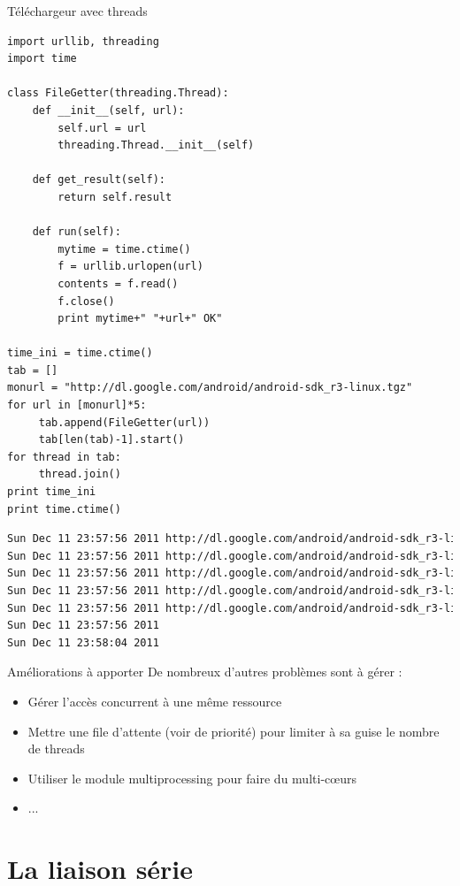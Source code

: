 \documentclass{beamer}
\begin{document}
\begin{frame}[fragile]{Téléchargeur avec threads}
\begin{lstlisting}[basicstyle=\tiny, multicols=2]
import urllib, threading
import time

class FileGetter(threading.Thread):
    def __init__(self, url):
        self.url = url
        threading.Thread.__init__(self)

    def get_result(self):
        return self.result

    def run(self):
        mytime = time.ctime()
        f = urllib.urlopen(url)
        contents = f.read()
        f.close()
        print mytime+" "+url+" OK"

time_ini = time.ctime()
tab = []
monurl = "http://dl.google.com/android/android-sdk_r3-linux.tgz"
for url in [monurl]*5:
     tab.append(FileGetter(url))
     tab[len(tab)-1].start()
for thread in tab:
     thread.join()
print time_ini
print time.ctime()
\end{lstlisting}
\begin{lstlisting}[language=bash, basicstyle=\tiny]
Sun Dec 11 23:57:56 2011 http://dl.google.com/android/android-sdk_r3-linux.tgz OK
Sun Dec 11 23:57:56 2011 http://dl.google.com/android/android-sdk_r3-linux.tgz OK
Sun Dec 11 23:57:56 2011 http://dl.google.com/android/android-sdk_r3-linux.tgz OK
Sun Dec 11 23:57:56 2011 http://dl.google.com/android/android-sdk_r3-linux.tgz OK
Sun Dec 11 23:57:56 2011 http://dl.google.com/android/android-sdk_r3-linux.tgz OK
Sun Dec 11 23:57:56 2011
Sun Dec 11 23:58:04 2011
\end{lstlisting}
\end{frame}

\begin{frame}[fragile]{Améliorations à apporter}
De nombreux d'autres problèmes sont à gérer :
\begin{itemize}
 \item Gérer l'accès concurrent à une même ressource
 \item Mettre une file d'attente (voir de priorité) pour limiter à sa guise le nombre de threads
 \item Utiliser le module multiprocessing pour faire du multi-c\oe{}urs
 \item ...
\end{itemize}
\end{frame}


\section{La liaison série}
\end{document}
